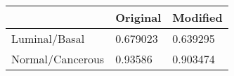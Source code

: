 \begin{tabular}{lll}
\toprule
{} &  Original &  Modified \\
\midrule
Luminal/Basal    &  0.679023 &  0.639295 \\
Normal/Cancerous &   0.93586 &  0.903474 \\
\bottomrule
\end{tabular}
